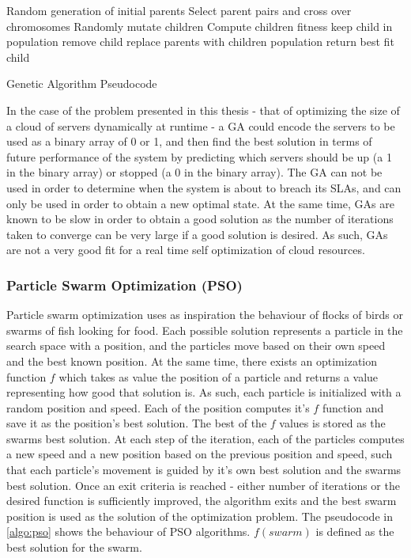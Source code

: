 \begin{algorithm}
\begin{algorithmic}
\State Random generation of initial parents
	\State Select parent pairs and cross over chromosomes
	\State Randomly mutate children
	\State Compute children fitness
		\State keep child in population
	\Else
		\State remove child
	\EndIf
	\State replace parents with children population
\EndWhile
\State return best fit child
\end{algorithmic}
\caption{Genetic Algorithm Pseudocode}\label{algo:ga}
\end{algorithm}

In the case of the problem presented in this thesis - that of optimizing the size of a cloud of servers dynamically at runtime - a GA could encode the servers to be used as a binary array of 0 or 1, and then find the best solution in terms of future performance of the system by predicting which servers should be up (a 1 in the binary array) or stopped (a 0 in the binary array). The GA can not be used in order to determine when the system is about to breach its SLAs, and can only be used in order to obtain a new optimal state. At the same time, GAs are known to be slow in order to obtain a good solution as the number of iterations taken to converge can be very large if a good solution is desired. As such, GAs are not a very good fit for a real time self optimization of cloud resources.

\subsubsection{Particle Swarm Optimization (PSO)}

Particle swarm optimization uses as inspiration the behaviour of flocks of birds or swarms of fish looking for food. Each possible solution represents a particle in the search space with a position, and the particles move based on their own speed and the best known position. At the same time, there exists an optimization function $f$ which takes as value the position of a particle and returns a value representing how good that solution is. As such, each particle is initialized with a random position and speed. Each of the position computes it's $f$ function and save it as the position's best solution. The best of the $f$ values is stored as the swarms best solution. At each step of the iteration, each of the particles computes a new speed and a new position based on the previous position and speed, such that each particle's movement is guided by it's own best solution and the swarms best solution. Once an exit criteria is reached - either number of iterations or the desired function is sufficiently improved, the algorithm exits and the best swarm position is used as the solution of the optimization problem. The pseudocode in \ref{algo:pso} shows the behaviour of PSO algorithms. $f(swarm)$ is defined as the best solution for the swarm.

